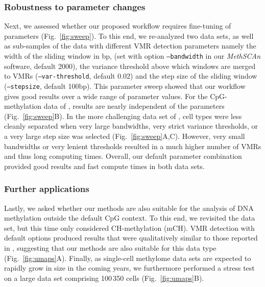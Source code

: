 \documentclass[twocolumn,10pt]{article}
\newcommand{\new}[1]{#1} %
\begin{document}
\subsubsection{Robustness to parameter changes}

\new{Next}, we assessed whether our proposed workflow requires fine-tuning of parameters (Fig.~\ref{fig:sweep}).
To this end, we re-analyzed \new{two} data sets, as well as sub-samples of the data with different VMR detection parameters namely the width of the sliding window in bp, (set with option \texttt{--bandwidth} in our \textit{MethSCAn} software, default 2000), the variance threshold above which windows are merged to VMRs (\texttt{--var-threshold}, default 0.02) \new{and the step size of the sliding window (\texttt{--stepsize}, default 100bp).}
This parameter sweep showed that our workflow gives good results over a wide range of parameter values.
For the \new{CpG-methylation} data of \citet{luo2017single}, results are nearly independent of the parameters (Fig.~\ref{fig:sweep}B).
In the more challenging data set of \citet{kremer_scnmt}, cell types were less cleanly separated when very large bandwidths, very strict variance thresholds, \new{or a very large step size was} selected (Fig.~\ref{fig:sweep}A,C).
However, very small bandwidths or very lenient thresholds resulted in a much higher number of VMRs and thus long computing times.
Overall, our default parameter combination provided good results and fast compute times in both data sets.


\subsubsection{Further applications}

\new{
Lastly, we asked whether our methods are also suitable for the analysis of DNA methylation outside the default CpG context.
To this end, we revisited the \citet{luo2017single} data set, but this time only considered CH-methylation (mCH).
VMR detection with default options produced results that were qualitatively similar to those reported in \citet{luo2017single}, suggesting that our methods are also suitable for this data type (Fig.~\ref{fig:umaps}A).
Finally, as single-cell methylome data sets are expected to rapidly grow in size in the coming years, we furthermore performed a stress test on a large data set comprising 100\,350 cells \citep{liu2021dna} (Fig.~\ref{fig:umaps}B).
}
\end{document}
